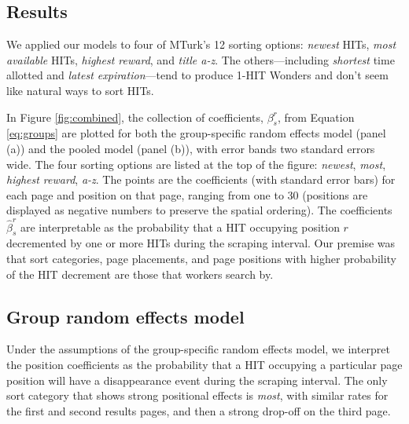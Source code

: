 \documentclass{sig-alternate}
\begin{document}
\subsection{Results}
\begin{figure*}
  \centering 
  \caption{Effects of position in sort category on HIT
    disappearance.  Pages are illustrated with
    color. Horizonal lines represent one standard error on either side. \label{fig:combined}}
\end{figure*} 

We applied our models to four of MTurk's 12 sorting options: {\em newest} HITs, {\em most available}
HITs, {\em highest reward}, and {\em title a-z}.  The others---including {\em
  shortest} time allotted and {\em latest expiration}---tend to produce 1-HIT Wonders and don't seem like natural ways to sort HITs.

In Figure \ref{fig:combined}, the collection of coefficients,
$\beta^r_s$, from Equation \ref{eq:groups} are plotted for both the
group-specific random effects model (panel (a)) and the pooled model
(panel (b)), with error bands two standard errors wide.  The four sorting
options are listed at the top of the figure: {\em newest}, {\em most},
{\em highest reward}, {\em a-z}.  The points are the coefficients
(with standard error bars) for each page and position on that page,
ranging from one to 30 (positions are displayed as negative numbers to
preserve the spatial ordering).  The coefficients $\hat{\beta}^r_s$
are interpretable as the probability that a HIT occupying position $r$
decremented by one or more HITs during the scraping interval.  Our
premise was that sort categories, page placements, and page positions with higher probability of the HIT decrement are those that workers search by.

\subsection{Group random effects model} 
Under the assumptions of the group-specific random effects model, we
interpret the position coefficients as the probability that a HIT
occupying a particular page position will have a disappearance event
during the scraping interval. The only sort category that shows strong
positional effects is {\em most}, with similar rates for the first and
second results pages, and then a strong drop-off on the third page.
\end{document}
